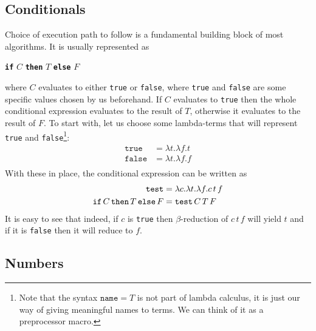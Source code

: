 \documentclass[11pt,twoside,a4paper]{article} %
\newcommand{\kw}[1]{{\bf \texttt{#1}}}
\newcommand{\mkw}[1]{{\bf \mathtt{#1}}}
\newcommand{\sym}[1]{\texttt{#1}}
\newcommand{\msym}[1]{\mathtt{#1}}
\begin{document}
\subsection{Conditionals}

Choice of execution path to follow is a fundamental building block of most
algorithms. It is usually represented as 
\begin{center}
\kw{if} $C$ \kw{then} $T$ \kw{else} $F$
\end{center}
where $C$ evaluates to either \sym{true} or \sym{false}, where \sym{true} and 
\sym{false} are some specific values chosen by us beforehand. If $C$ evaluates 
to \sym{true} then the whole conditional expression evaluates to the result of 
$T$, otherwise it evaluates to the result of $F$. To start with, let us choose 
some lambda-terms that will represent \sym{true} and \sym{false}\footnote{Note
that the syntax $\msym{name} = T$ is not part of lambda calculus, it is just
our way of giving meaningful names to terms. We can think of it as a
preprocessor macro.}:
\begin{align*}
\msym{true}  &= \lambda t.\lambda f.t \\
\msym{false} &= \lambda t.\lambda f.f \\
\end{align*}
With these in place, the conditional expression can be written as
\begin{align*}
\msym{test} &= \lambda c.\lambda t.\lambda f.c\,t\,f \\
\mkw{if}\,C\,\mkw{then}\,T\,\mkw{else}\,F &= \msym{test}\,C\,T\,F
\end{align*}
It is easy to see that indeed, if $c$ is \sym{true} then $\beta$-reduction of
$c\,t\,f$ will yield $t$ and if it is \sym{false} then it will reduce to $f$.

\subsection{Numbers}
\end{document}
